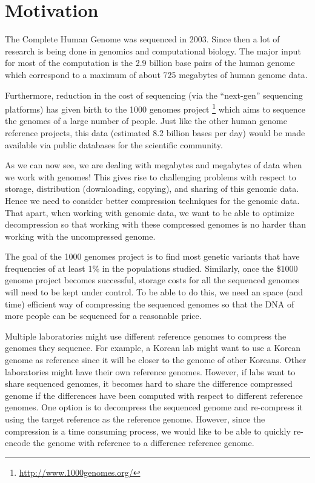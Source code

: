 \documentclass[11pt]{article}
\begin{document}
\clearpage

\tableofcontents

\setlength{\parskip}{1.9ex plus 0.5ex minus 0.2ex}

\clearpage

\section{Motivation}

The Complete Human Genome was sequenced in 2003. Since then a lot of
research is being done in genomics and computational biology. The
major input for most of the computation is the 2.9 billion base pairs
\cite{howmuchsequenced}\cite{findinghumangenome} of the human genome
which correspond to a maximum of about 725 megabytes of human
genome data.\cite{wikipediahumangenome}

Furthermore, reduction in the cost of sequencing (via the ``next-gen''
sequencing platforms) has given birth to the 1000 genomes project
\footnote{\url{http://www.1000genomes.org/}} which aims to sequence
the genomes of a large number of people. Just like the other human
genome reference projects, this data (estimated 8.2 billion bases per
day) would be made available via public databases for the scientific
community.\cite{1000genomes}

As we can now see, we are dealing with megabytes and megabytes of data 
when we work with genomes! This gives rise to challenging 
problems with respect to storage, distribution (downloading, copying), 
and sharing of this genomic data. Hence we need to consider better 
compression techniques for the genomic data. That apart, when working
with genomic data, we want to be able to optimize decompression so
that working with these compressed genomes is no harder than working
with the uncompressed genome.

The goal of the 1000 genomes project is to find most genetic variants
that have frequencies of at least 1\% in the populations
studied. Similarly, once the \$1000 genome
project\cite{1000dollargenomeproject} becomes successful, storage
costs for all the sequenced genomes will need to be kept under
control. To be able to do this, we need an space (and time) efficient
way of compressing the sequenced genomes so that the DNA of more
people can be sequenced for a reasonable price.

Multiple laboratories might use different reference genomes to
compress the genomes they sequence. For example, a Korean lab might
want to use a Korean genome as reference since it will be closer to
the genome of other Koreans. Other laboratories might have their own
reference genomes. However, if labs want to share sequenced genomes,
it becomes hard to share the difference compressed genome if the
differences have been computed with respect to different reference
genomes. One option is to decompress the sequenced genome and
re-compress it using the target reference as the reference
genome. However, since the compression is a time consuming process, we
would like to be able to quickly re-encode the genome with reference
to a difference reference genome.
\end{document}
